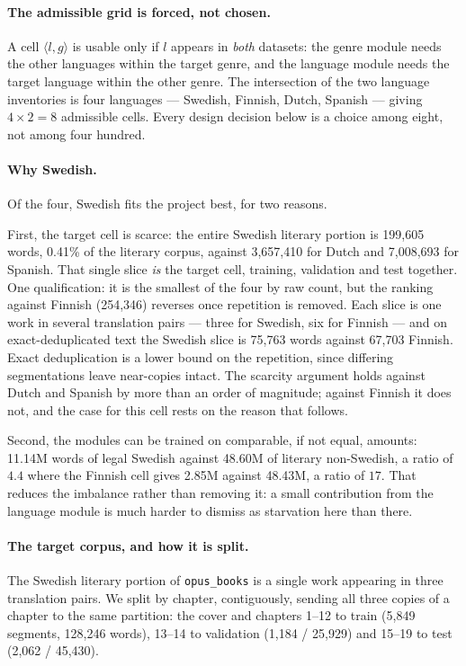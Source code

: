 \documentclass[10pt,twocolumn,a4paper]{article}
\newcommand{\tec}[1]{{\small\texttt{#1}}}
\begin{document}
\paragraph{The admissible grid is forced, not chosen.}
A cell $\langle l,g\rangle$ is usable only if $l$ appears in \emph{both}
datasets: the genre module needs the other languages within the target genre,
and the language module needs the target language within the other genre. The
intersection of the two language inventories is four languages --- Swedish,
Finnish, Dutch, Spanish --- giving $4\times 2 = 8$ admissible cells. Every
design decision below is a choice among eight, not among four hundred.

\paragraph{Why Swedish.} Of the four, Swedish fits the project best, for two
reasons.

First, the target cell is scarce: the entire Swedish literary portion is
199{,}605 words, 0.41\% of the literary corpus, against 3{,}657{,}410 for Dutch
and 7{,}008{,}693 for Spanish. That single slice \emph{is} the target cell,
training, validation and test together. One qualification: it is the smallest of the four by raw count, but the
ranking against Finnish (254{,}346) reverses once repetition is removed. Each
slice is one work in several translation pairs --- three for Swedish, six for
Finnish --- and on exact-deduplicated text the Swedish slice is 75{,}763 words
against 67{,}703 Finnish. Exact deduplication is a lower bound on the
repetition, since differing segmentations leave near-copies intact. The scarcity argument
holds against Dutch and Spanish by more than an order of magnitude; against
Finnish it does not, and the case for this cell rests on the reason that
follows.

Second, the modules can be trained on comparable, if not equal, amounts: 11.14M
words of legal Swedish against 48.60M of literary non-Swedish, a ratio of $4.4$
where the Finnish cell gives 2.85M against 48.43M, a ratio of $17$. That reduces the imbalance rather than
removing it: a small contribution from the language module is much harder to
dismiss as starvation here than there.

\paragraph{The target corpus, and how it is split.}
\label{sec:cell}
The Swedish literary portion of \tec{opus\_books} is a single work appearing in
three translation pairs. We split by chapter, contiguously, sending all three
copies of a chapter to the same partition: the cover and chapters 1--12 to train
(5{,}849 segments, 128{,}246 words), 13--14 to validation (1{,}184 / 25{,}929)
and 15--19 to test (2{,}062 / 45{,}430).
\end{document}
